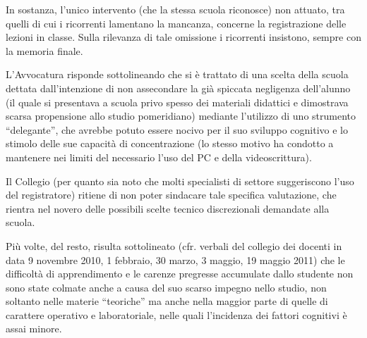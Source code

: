 \begin{enumerate}
	In sostanza, l'unico intervento (che la stessa scuola riconosce) non attuato, tra quelli di cui i ricorrenti lamentano la mancanza, concerne la registrazione delle lezioni in classe. Sulla rilevanza di tale omissione i ricorrenti insistono, sempre con la memoria finale.
	
	L'Avvocatura risponde sottolineando che si è trattato di una scelta della scuola dettata dall'intenzione di non assecondare la già spiccata negligenza dell'alunno (il quale si presentava a scuola privo spesso dei materiali didattici e dimostrava scarsa propensione allo studio pomeridiano) mediante l'utilizzo di uno strumento “delegante”, che avrebbe potuto essere nocivo per il suo sviluppo cognitivo e lo stimolo delle sue capacità di concentrazione (lo stesso motivo ha condotto a mantenere nei limiti del necessario l'uso del PC e della videoscrittura).
	
	Il Collegio (per quanto sia noto che molti specialisti di settore suggeriscono l'uso del registratore) ritiene di non poter sindacare tale specifica valutazione, che rientra nel novero delle possibili scelte tecnico discrezionali demandate alla scuola.
	
	Più volte, del resto, risulta sottolineato (cfr. verbali del collegio dei docenti in data 9 novembre 2010, 1 febbraio, 30 marzo, 3 maggio, 19 maggio 2011) che le difficoltà di apprendimento e le carenze pregresse accumulate dallo studente non sono state colmate anche a causa del suo scarso impegno nello studio, non soltanto nelle materie “teoriche” ma anche nella maggior parte di quelle di carattere operativo e laboratoriale, nelle quali l'incidenza dei fattori cognitivi è assai minore.
	

\end{enumerate}
